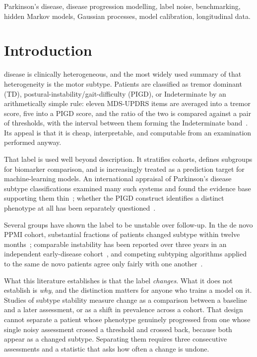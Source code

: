 \documentclass[journal]{IEEEtran}
\begin{document}
\begin{IEEEkeywords}
Parkinson's disease, disease progression modelling, label noise, benchmarking,
hidden Markov models, Gaussian processes, model calibration, longitudinal data.
\end{IEEEkeywords}

\IEEEpeerreviewmaketitle

\section{Introduction}

 disease is clinically heterogeneous, and the most
widely used summary of that heterogeneity is the motor subtype. Patients are
classified as tremor dominant (TD), postural-instability/gait-difficulty
(PIGD), or Indeterminate by an arithmetically simple rule: eleven MDS-UPDRS
items are averaged into a tremor score, five into a PIGD score, and the ratio of
the two is compared against a pair of thresholds, with the interval between them
forming the Indeterminate band~\cite{stebbins2013,goetz2008}. Its appeal is that
it is cheap, interpretable, and computable from an examination performed anyway.

That label is used well beyond description. It stratifies cohorts, defines
subgroups for biomarker comparison, and is increasingly treated as a prediction
target for machine-learning models. An international appraisal of Parkinson's
disease subtype classifications examined many such systems and found the
evidence base supporting them thin~\cite{mestre2021,marras2024}; whether the
PIGD construct identifies a distinct phenotype at all has been separately
questioned~\cite{nutt2016,urso2022}.

Several groups have shown the label to be unstable over follow-up. In the de
novo PPMI cohort, substantial fractions of patients changed subtype within
twelve months~\cite{simuni2016}; comparable instability has been reported over
three years in an independent early-disease cohort~\cite{kohat2021}, and
competing subtyping algorithms applied to the same de novo patients agree only
fairly with one another~\cite{ren2020,ren2021}.

What this literature establishes is that the label \emph{changes}. What it does
not establish is \emph{why}, and the distinction matters for anyone who trains a
model on it. Studies of subtype stability measure change as a comparison
between a baseline and a later assessment, or as a shift in prevalence across a
cohort. That design cannot separate a patient whose phenotype genuinely
progressed from one whose single noisy assessment crossed a threshold and
crossed back, because both appear as a changed subtype. Separating them requires
three consecutive assessments and a statistic that asks how often a change is
undone.
\end{document}
